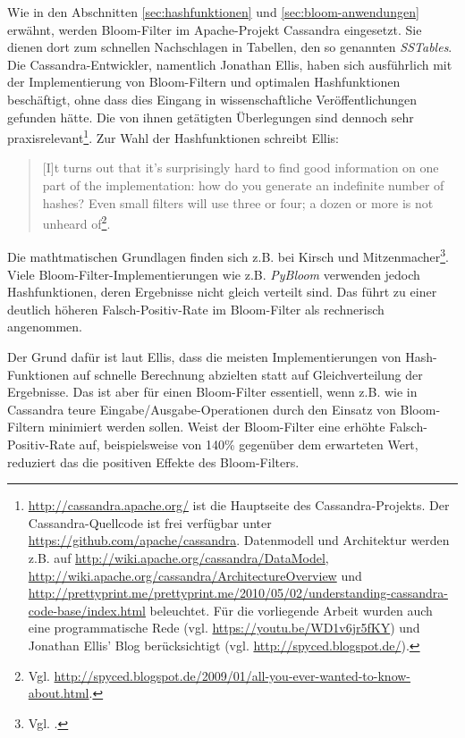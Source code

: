 Wie in den Abschnitten \ref{sec:hashfunktionen} und \ref{sec:bloom-anwendungen} erwähnt, werden Bloom-Filter im Apache-Projekt Cassandra eingesetzt. Sie dienen dort zum schnellen Nachschlagen in Tabellen, den so genannten \textit{SSTables}. Die Cassandra-Entwickler, namentlich Jonathan Ellis, haben sich ausführlich mit der Implementierung von Bloom-Filtern und optimalen Hashfunktionen beschäftigt, ohne dass dies Eingang in wissenschaftliche Veröffentlichungen gefunden hätte. Die von ihnen getätigten Überlegungen sind dennoch sehr praxisrelevant\footnote{\url{http://cassandra.apache.org/} ist die Hauptseite des Cassandra-Projekts. Der Cassandra-Quellcode ist frei verfügbar unter \url{https://github.com/apache/cassandra}. Datenmodell und Architektur werden z.B. auf \url{http://wiki.apache.org/cassandra/DataModel}, \url{http://wiki.apache.org/cassandra/ArchitectureOverview} und \url{http://prettyprint.me/prettyprint.me/2010/05/02/understanding-cassandra-code-base/index.html} beleuchtet. Für die vorliegende Arbeit wurden auch eine programmatische Rede (vgl. \url{https://youtu.be/WD1v6jr5fKY}) und Jonathan Ellis' Blog berücksichtigt (vgl. \url{http://spyced.blogspot.de/}).}. Zur Wahl der Hashfunktionen schreibt Ellis: 
\begin{quote}
[I]t turns out that it's surprisingly hard to find good information on one part of the implementation: how do you generate an indefinite number of hashes? Even small filters will use three or four; a dozen or more is not unheard of\footnote{Vgl. \url{http://spyced.blogspot.de/2009/01/all-you-ever-wanted-to-know-about.html}.}. 
\end{quote}
Die mathtmatischen Grundlagen finden sich z.B. bei Kirsch und Mitzenmacher\footnote{Vgl. \cite{Kirsch2006}.}. Viele Bloom-Filter-Implementierungen wie z.B. \textit{PyBloom} verwenden jedoch Hashfunktionen, deren Ergebnisse nicht gleich verteilt sind. Das führt zu einer deutlich höheren Falsch-Positiv-Rate im Bloom-Filter als rechnerisch angenommen. 

Der Grund dafür ist laut Ellis, dass die meisten Implementierungen von Hash-Funktionen auf schnelle Berechnung abzielten statt auf Gleichverteilung der Ergebnisse. Das ist aber für einen Bloom-Filter essentiell, wenn z.B. wie in Cassandra teure Eingabe/Ausgabe-Operationen durch den Einsatz von Bloom-Filtern minimiert werden sollen. Weist der Bloom-Filter eine erhöhte Falsch-Positiv-Rate auf, beispielsweise von 140\% gegenüber dem erwarteten Wert, reduziert das die positiven Effekte des Bloom-Filters.  

